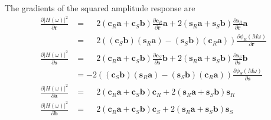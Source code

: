 \documentclass[a4paper,twoside,10pt,english]{report}
\begin{document}
The gradients of the squared amplitude response are
\begin{align*}
\frac{\partial\left|H\left(\omega\right)\right|^{2}}{\partial\boldsymbol{r}}
&=\phantom{-} 2\left(\boldsymbol{c}_{R}\boldsymbol{a}+
\boldsymbol{c}_{S}\boldsymbol{b}\right)
\frac{\partial\boldsymbol{c}_{R}}{\partial\boldsymbol{r}}\boldsymbol{a}+
2\left(\boldsymbol{s}_{R}\boldsymbol{a}+
\boldsymbol{s}_{S}\boldsymbol{b}\right)
\frac{\partial\boldsymbol{s}_{R}}{\partial\boldsymbol{r}}\boldsymbol{a}\\
&=\phantom{-} 2\left(
\left(\boldsymbol{c}_{S}\boldsymbol{b}\right)
\left(\boldsymbol{s}_{R}\boldsymbol{a}\right)-
\left(\boldsymbol{s}_{S}\boldsymbol{b}\right)
\left(\boldsymbol{c}_{R}\boldsymbol{a}\right)\right)
\frac{\partial\phi_{R}\left(M\omega\right)}{\partial\boldsymbol{r}}\\
\frac{\partial\left|H\left(\omega\right)\right|^{2}}{\partial\boldsymbol{s}}
&=\phantom{-} 2\left(
\boldsymbol{c}_{R}\boldsymbol{a}+
\boldsymbol{c}_{S}\boldsymbol{b}\right)
\frac{\partial\boldsymbol{c}_{S}}{\partial\boldsymbol{s}}\boldsymbol{b}+
2\left(\boldsymbol{s}_{R}\boldsymbol{a}+
\boldsymbol{s}_{S}\boldsymbol{b}\right)
\frac{\partial\boldsymbol{s}_{S}}{\partial\boldsymbol{s}}\boldsymbol{b}\\
&=-2\left(
\left(\boldsymbol{c}_{S}\boldsymbol{b}\right)
\left(\boldsymbol{s}_{R}\boldsymbol{a}\right)-
\left(\boldsymbol{s}_{S}\boldsymbol{b}\right)
\left(\boldsymbol{c}_{R}\boldsymbol{a}\right)\right)
\frac{\partial\phi_{S}\left(M\omega\right)}{\partial\boldsymbol{s}}\\
\frac{\partial\left|H\left(\omega\right)\right|^{2}}{\partial\boldsymbol{a}}
&=\phantom{-} 2\left(\boldsymbol{c}_{R}\boldsymbol{a}+
         \boldsymbol{c}_{S}\boldsymbol{b}\right)\boldsymbol{c}_{R}+
  2\left(\boldsymbol{s}_{R}\boldsymbol{a}+
         \boldsymbol{s}_{S}\boldsymbol{b}\right)\boldsymbol{s}_{R}\\
\frac{\partial\left|H\left(\omega\right)\right|^{2}}{\partial\boldsymbol{b}}
&=\phantom{-} 2\left(\boldsymbol{c}_{R}\boldsymbol{a}+
         \boldsymbol{c}_{S}\boldsymbol{b}\right)\boldsymbol{c}_{S}+
  2\left(\boldsymbol{s}_{R}\boldsymbol{a}+
         \boldsymbol{s}_{S}\boldsymbol{b}\right)\boldsymbol{s}_{S}
\end{align*}
\end{document}
